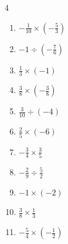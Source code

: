 \begin{multicols}{4}
\begin{enumerate}

  \item $\displaystyle -\frac{1}{10}\times{}\left(-\frac{5}{3}\right)$


  \item $\displaystyle -1\div{}\left(-\frac{7}{6}\right)$


  \item $\displaystyle \frac{1}{3}\times{}\left(-1\right)$


  \item $\displaystyle \frac{3}{8}\times{}\left(-\frac{3}{8}\right)$


\columnbreak %

  \item $\displaystyle \frac{3}{10}\div{}\left(-4\right)$


  \item $\displaystyle \frac{2}{5}\times{}\left(-6\right)$


  \item $\displaystyle -\frac{3}{4}\times{}\frac{3}{5}$


  \item $\displaystyle -\frac{2}{9}\div{}\frac{5}{2}$


  \item $\displaystyle -1\times{}\left(-2\right)$

        \phantom{$\displaystyle =2$}

  \item $\displaystyle \frac{3}{8}\times{}\frac{1}{3}$


  \item $\displaystyle -\frac{5}{4}\times{}\left(-\frac{1}{2}\right)$



\end{enumerate}
\end{multicols}
